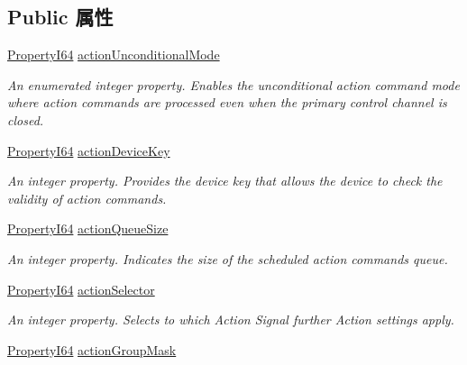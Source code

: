 \subsection*{Public 属性}
\begin{DoxyCompactItemize}
\item 
\hyperlink{group___common_interface_ga81749b2696755513663492664a18a893}{Property\+I64} \hyperlink{classmv_i_m_p_a_c_t_1_1acquire_1_1_gen_i_cam_1_1_action_control_a80144bc0580fb0e00e2658f0a6176d16}{action\+Unconditional\+Mode}
\begin{DoxyCompactList}\small\item\em An enumerated integer property. Enables the unconditional action command mode where action commands are processed even when the primary control channel is closed. \end{DoxyCompactList}\item 
\hyperlink{group___common_interface_ga81749b2696755513663492664a18a893}{Property\+I64} \hyperlink{classmv_i_m_p_a_c_t_1_1acquire_1_1_gen_i_cam_1_1_action_control_a8487e253702573ed62fb68c9c48922e0}{action\+Device\+Key}
\begin{DoxyCompactList}\small\item\em An integer property. Provides the device key that allows the device to check the validity of action commands. \end{DoxyCompactList}\item 
\hyperlink{group___common_interface_ga81749b2696755513663492664a18a893}{Property\+I64} \hyperlink{classmv_i_m_p_a_c_t_1_1acquire_1_1_gen_i_cam_1_1_action_control_a7936345c8ca15b298a749b1410e1fa35}{action\+Queue\+Size}
\begin{DoxyCompactList}\small\item\em An integer property. Indicates the size of the scheduled action commands queue. \end{DoxyCompactList}\item 
\hyperlink{group___common_interface_ga81749b2696755513663492664a18a893}{Property\+I64} \hyperlink{classmv_i_m_p_a_c_t_1_1acquire_1_1_gen_i_cam_1_1_action_control_ac5e7271633d0a2566ed8980db4d3a3b1}{action\+Selector}
\begin{DoxyCompactList}\small\item\em An integer property. Selects to which Action Signal further Action settings apply. \end{DoxyCompactList}\item 
\hyperlink{group___common_interface_ga81749b2696755513663492664a18a893}{Property\+I64} \hyperlink{classmv_i_m_p_a_c_t_1_1acquire_1_1_gen_i_cam_1_1_action_control_ad28ef9aae758a7b229bf34268ab88e74}{action\+Group\+Mask}

\end{DoxyCompactItemize}
